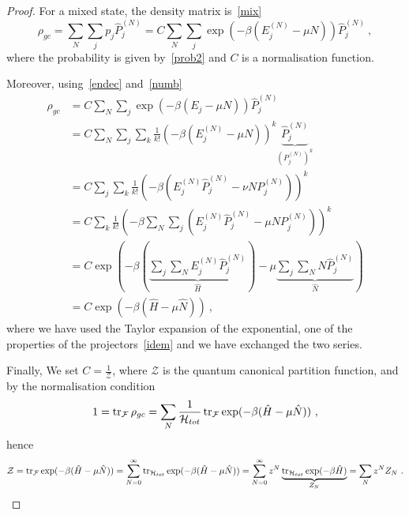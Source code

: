     \begin{proof}
        For a mixed state, the density matrix is~\eqref{mix}
        \begin{equation*}
            \rho_{gc} = \sum_N \sum_j p_j \hat P_j^{(N)} = C \sum_N \sum_j \exp(- \beta (E_j^{(N)} - \mu N)) \hat P_j^{(N)} ~,
        \end{equation*}
        where the probability is given by~\eqref{prob2} and $C$ is a normalisation function.

        Moreover, using~\eqref{endec} and~\eqref{numb}
        \begin{equation*}
        \begin{aligned}
            \rho_{gc} & = C \sum_N \sum_j \exp(- \beta (E_j - \mu N)) \hat P_j^{(N)} \\ & = C \sum_N \sum_j \sum_k \frac{1}{k!} (-\beta (E_j^{(N)} - \mu N))^k \underbrace{\hat P_j^{(N)}}_{(P_j^{(N)})^k} \\ & = C \sum_j \sum_k \frac{1}{k!} (-\beta (E_j^{(N)} \hat P_j^{(N)} - \nu N P_j^{(N)}))^k \\ & = C \sum_k \frac{1}{k!} (-\beta \sum_N \sum_j (E_j^{(N)} \hat P_j^{(N)} - \mu N P_j^{(N)}))^k \\ & = C \exp(- \beta (\underbrace{\sum_j \sum_N E_j^{(N)} \hat P_j^{(N)}}_{\hat H}) - \mu \underbrace{\sum_j \sum_N N \hat P_j^{(N)}}_{\hat N}) \\ & = C \exp(- \beta (\hat H - \mu \hat N)) ~,
        \end{aligned}
        \end{equation*}
        where we have used the Taylor expansion of the exponential, one of the properties of the projectors~\eqref{idem} and we have exchanged the two series.

        Finally, We set $C = \frac{1}{\mathcal Z}$, where $\mathcal Z$ is the quantum canonical partition function, and by the normalisation condition 
        \begin{equation*}
            1 = \operatorname{tr}_{\mathcal F} \rho_{gc} = \sum_N \frac{1}{\mathcal H_{tot}} \operatorname{tr}_{\mathcal F} \exp(- \beta (\hat H - \mu \hat N)) ~,
        \end{equation*}
        hence 
        \begin{equation*}
            \mathcal Z = \operatorname{tr}_{\mathcal F} \exp(- \beta (\hat H - \mu \hat N)) = \sum_{N=0}^{\infty} \operatorname{tr}_{\mathcal H_{tot}} \exp(- \beta (\hat H - \mu \hat N)) = \sum_{N=0}^{\infty} z^N \underbrace{\operatorname{tr}_{\mathcal H_{tot}} \exp(- \beta \hat H)}_{Z_N} = \sum_N z^N Z_N ~.
        \end{equation*}
    \end{proof}

